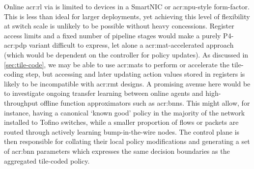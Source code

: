 

Online \gls{acr:rl} via \approachshort{} is limited to devices in a SmartNIC or \gls{acr:npu}-style form-factor.
This is less than ideal for larger deployments, yet achieving this level of flexibility at switch scale is unlikely to be possible without heavy concessions.
Register access limits and a fixed number of pipeline stages would make a purely P4-\gls{acr:pdp} variant difficult to express, let alone a \gls{acr:mat}-accelerated approach (which would be dependent on the controller for policy updates).
As discussed in \cref{sec:tile-code}, we may be able to use \glspl{acr:mat} to perform or accelerate the tile-coding step, but accessing and later updating action values stored in registers is likely to be incompatible with \gls{acr:rmt} designs.
A promising avenue here would be to investigate ongoing transfer learning between online \approachshort{} agents and high-throughput offline function approximators such as \glspl{acr:bnn}.
This might allow, for instance, having a canonical `known good' policy in the majority of the network installed to Tofino switches, while a smaller proportion of flows or packets are routed through actively learning bump-in-the-wire nodes.
The control plane is then responsible for collating their local policy modifications and generating a set of \gls{acr:bnn} parameters which expresses the same decision boundaries as the aggregated tile-coded policy.


